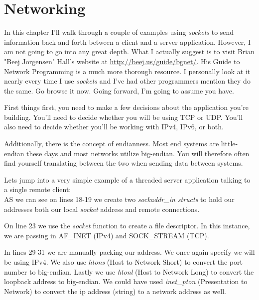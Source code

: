 \documentclass[../main.tex]{subfiles}
\begin{document}
	\chapter{Networking}\label{ch:networking}
	In this chapter I'll walk through a couple of examples using \textit{sockets} to send information back and forth between a client and a server application.  However, I am not going to go into any great depth.  What I actually suggest is to visit Brian "Beej Jorgensen" Hall's website at \url{http://beej.us/guide/bgnet/}.  His Guide to Network Programming \cite{beej_network_programming} is a much more thorough resource.  I personally look at it nearly every time I use \textit{sockets} and I've had other programmers mention they do the same. Go browse it now.  Going forward, I'm going to assume you have.
	
	First things first, you need to make a few decisions about the application you're building.  You'll need to decide whether you will be using TCP or UDP. You'll also need to decide whether you'll be working with IPv4, IPv6, or both.
	
	Additionally, there is the concept of endianness.  Most end systems are little-endian these days and most networks utilize big-endian.  You will therefore often find yourself translating between the two when sending data between systems.
	
	Lets jump into a very simple example of a threaded server application talking to a single remote client: \\
	
	
	
	AS we can see on lines 18-19 we create two \textit{sockaddr\_in structs} to hold our addresses both our local \textit{socket} address and remote connections.  
	
	On line 23 we use the \textit{socket} function to create a file descriptor.  In this instance, we are passing in AF\_INET (IPv4) and SOCK\_STREAM (TCP).
	
	In lines 29-31 we are manually packing our address.  We once again specify we will be using IPv4.  We also use \textit{htons} (Host to Network Short) to convert the port number to big-endian.  Lastly we use \textit{htonl} (Host to Network Long) to convert the loopback address to big-endian.  We could have used \textit{inet\_pton} (Presentation to Network) to convert the ip address (string) to a network address as well.
	
\end{document}
